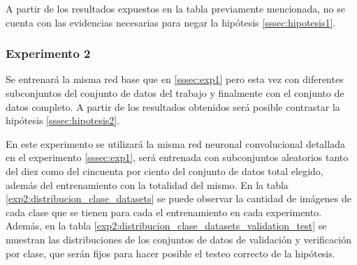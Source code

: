 A partir de los resultados expuestos en la tabla previamente mencionada, no se cuenta con las evidencias necesarias para negar la hipótesis \ref{sssec:hipotesis1}. 

\subsubsection{Experimento 2} \label{sssec:exp2}
Se entrenará la misma red base que en \ref{sssec:exp1} pero esta vez con diferentes subconjuntos del conjunto de datos del trabajo \cite{lstm_real_estate} y finalmente con el conjunto de datos completo. A partir de los resultados obtenidos será posible contrastar la hipótesis \ref{sssec:hipotesis2}.

En este experimento se utilizará la misma red neuronal convolucional detallada en el experimento \ref{sssec:exp1}, será entrenada con subconjuntos aleatorios tanto del diez como del cincuenta por ciento del conjunto de datos total elegido, además del entrenamiento con la totalidad del mismo. En la tabla \ref{exp2:distribucion_clase_datasets} se puede observar la cantidad de imágenes de cada clase que se tienen para cada el entrenamiento en cada experimento. Además, en la tabla \ref{exp2:distribucion_clase_datasets_validation_test} se muestran las distribuciones de los conjuntos de datos de validación y verificación por clase, que serán fijos para hacer posible el testeo correcto de la hipótesis.

